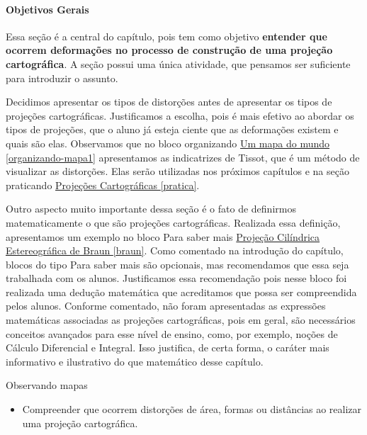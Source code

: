 {\begin{texto}
{\paragraph{Objetivos Gerais}

Essa seção é a central do capítulo, pois tem como objetivo \textbf{entender que ocorrem deformações no processo de construção de uma projeção cartográfica}. A seção possui uma única atividade, que pensamos ser suficiente para introduzir o assunto. 

Decidimos apresentar os tipos de distorções antes de apresentar os tipos de  projeções cartográficas. Justificamos a escolha, pois é mais efetivo ao abordar os tipos de projeções, que o aluno já esteja ciente que as deformações existem e quais são elas. Observamos que no bloco organizando  \hyperref[organizando-mapa1]{ Um mapa do mundo \ref{organizando-mapa1}} apresentamos as indicatrizes de Tissot, que é um método de visualizar as distorções. Elas serão utilizadas nos próximos capítulos e na seção praticando \hyperref[pratica]{ Projeções Cartográficas \ref{pratica}}.

Outro aspecto muito importante dessa seção é o fato de definirmos matematicamente o que são projeções cartográficas. Realizada essa definição, apresentamos um exemplo no bloco Para saber mais  \hyperref[braun]{ Projeção Cilíndrica Estereográfica de Braun \ref{braun}}. Como comentado na introdução do capítulo, blocos do tipo Para saber mais são opcionais, mas recomendamos que essa seja trabalhada com os alunos. Justificamos essa recomendação pois nesse bloco foi realizada uma  dedução matemática que acreditamos que possa ser compreendida pelos alunos. Conforme comentado, não foram apresentadas as expressões matemáticas associadas as projeções cartográficas, pois em geral, são necessários conceitos avançados para esse nível de ensino, como, por exemplo, noções de Cálculo Diferencial e Integral. Isso justifica, de certa forma, o caráter mais informativo e ilustrativo do que matemático desse capítulo.
}
\end{texto}

\begin{objectives}{Observando mapas}
{
  \begin{itemize}
  \item Compreender que ocorrem distorções de área, formas ou distâncias ao realizar uma projeção cartográfica.
 

\end{itemize}}
\end{objectives}}
